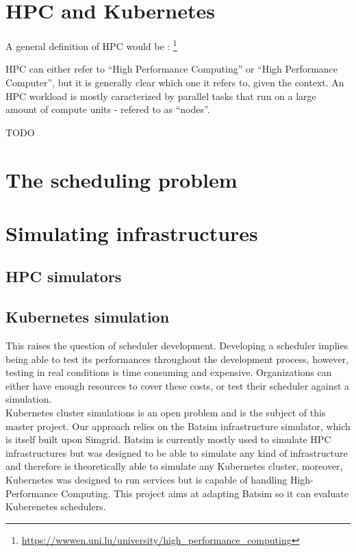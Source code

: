 \documentclass[12pt]{report}
\begin{document}
\section{HPC and Kubernetes}
A general definition of HPC would be :
\footnote{\url{https://wwwen.uni.lu/university/high_performance_computing}}

HPC can either refer to ``High Performance Computing'' or ``High Performance
Computer'', but it is generally clear which one it refers to, given the
context.
An HPC workload is mostly caracterized by parallel tasks that run on a large
amount of compute units - refered to as ``nodes''.

TODO




\section{The scheduling problem}

\section{Simulating infrastructures}
\subsection{HPC simulators}
\subsection{Kubernetes simulation}

This raises the question of scheduler development. Developing a scheduler
implies being able to test its performances throughout the development process,
however, testing in real conditions is time consuming and expensive.
Organizations can either have enough resources to cover these costs, or test
their scheduler against a simulation.\\

Kubernetes cluster simulations is an open problem and is the subject of this
master project. Our approach relies on the Batsim\cite{batsim} infrastructure
simulator, which is itself built upon Simgrid\cite{simgrid}. Batsim is
currently mostly used to simulate HPC infrastructures but was designed to be
able to simulate any kind of infrastructure and therefore is theoretically able
to simulate any Kubernetes cluster, moreover, Kubernetes was designed to run
services but is capable of handling High-Performance
Computing\cite{kube-for-hpc}. This project aims at adapting Batsim so it can
evaluate Kuberenetes schedulers.
\end{document}
